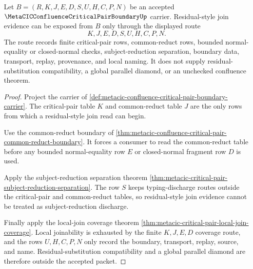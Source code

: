 \begin{theorem}
\label{thm:metacic-critical-pair-residual-join}
Let $B=(R,K,J,E,D,S,U,H,C,P,N)$ be an accepted $\MetaCICConfluenceCriticalPairBoundaryUp$ carrier. Residual-style join evidence can be exposed from $B$ only through the displayed route
$$
K,J,E,D,S,U,H,C,P,N .
$$
The route records finite critical-pair rows, common-reduct rows, bounded normal-equality or closed-normal checks, subject-reduction separation, boundary data, transport, replay, provenance, and local naming. It does not supply residual-substitution compatibility, a global parallel diamond, or an unchecked confluence theorem.
\end{theorem}
\begin{proof}
Project the carrier of \autoref{def:metacic-confluence-critical-pair-boundary-carrier}. The critical-pair table $K$ and common-reduct table $J$ are the only rows from which a residual-style join read can begin.

Use the common-reduct boundary of \autoref{thm:metacic-confluence-critical-pair-common-reduct-boundary}. It forces a consumer to read the common-reduct table before any bounded normal-equality row $E$ or closed-normal fragment row $D$ is used.

Apply the subject-reduction separation theorem \autoref{thm:metacic-critical-pair-subject-reduction-separation}. The row $S$ keeps typing-discharge routes outside the critical-pair and common-reduct tables, so residual-style join evidence cannot be treated as subject-reduction discharge.

Finally apply the local-join coverage theorem \autoref{thm:metacic-critical-pair-local-join-coverage}. Local joinability is exhausted by the finite $K,J,E,D$ coverage route, and the rows $U,H,C,P,N$ only record the boundary, transport, replay, source, and name. Residual-substitution compatibility and a global parallel diamond are therefore outside the accepted packet.
\end{proof}

